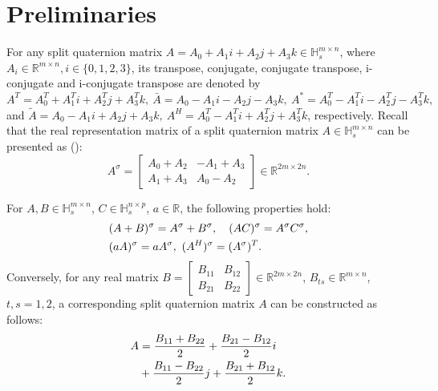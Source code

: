 \documentclass[12pt]{article}
\begin{document}
\section{Preliminaries}
For any split quaternion matrix ${A}=A_{0}+A_{1}i + A_{2}j + A_{3}k \in\mathbb{H}_{s}^{m\times n}$, where $A_{i}\in\mathbb{R}^{m\times n}, i\in\{0,1,2,3\}$, its transpose, conjugate, conjugate transpose, i-conjugate and i-conjugate transpose are  denoted by 
 ${A}^T = A_0^T + A_1^Ti + A_2^Tj + A_3^Tk, \ \bar{{A}} = A_0 - A_1i - A_2j - A_3k, \ {A}^* = A_0^T - A_1^Ti - A_2^Tj - A_3^Tk,$ and
 $\tilde{A} = A_0 - A_1i + A_2j + A_3k, \ {A}^H = A_0^T - A_1^Ti + A_2^Tj + A_3^Tk$, respectively. Recall that the real representation matrix of a split quaternion matrix $A \in\mathbb{H}_{s}^{m\times n}$ can be presented as (\citep{TJiang2018, Gang2024}):
\begin{equation}\label{eq:2.1}
A^\sigma = \begin{bmatrix} A_0 + A_2 & -A_1 + A_3 \\ A_1 + A_3 & A_0 - A_2 \end{bmatrix} \in \mathbb{R}^{2m \times 2n}.
\end{equation}

For $A, B \in \mathbb{H}_s^{m \times n}$, $C \in \mathbb{H}_s^{n \times p}$, $a \in \mathbb{R}$, the following properties hold:
\begin{align}\label{eq:2.2}
     &(A + B)^\sigma = A^\sigma + B^\sigma, \quad (AC)^\sigma = A^\sigma C^\sigma,  \notag \\
     &(a A)^\sigma = a A^\sigma, \ (A^H)^\sigma = (A^\sigma)^T.
\end{align}
Conversely, for any real matrix $B = \begin{bmatrix} B_{11} & B_{12} \\ B_{21} & B_{22} \end{bmatrix} \in \mathbb{R}^{2m \times 2n}$, $B_{ts} \in \mathbb{R}^{m \times n}$, $t, s = 1, 2$, a corresponding split quaternion matrix $A$ can be constructed as follows:
\begin{align}\label{eq:2.3}
{A} &= \frac{B_{11} + B_{22}}{2} + \frac{B_{21} - B_{12}}{2}i \notag  \\
&+ \frac{B_{11} - B_{22}}{2}j + \frac{B_{21} + B_{12}}{2}k.
\end{align}
\end{document}
